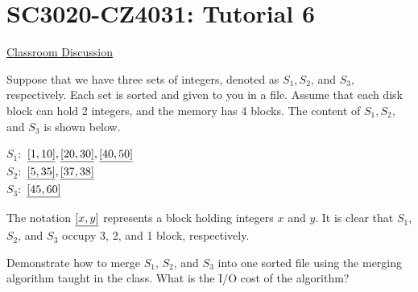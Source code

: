 


\usepackage{amsfonts, amsmath, amssymb, amsthm}
\usepackage{comment}
\usepackage{graphicx}
\usepackage{ifthen}
\usepackage{latexsym}
\usepackage[normalem]{ulem}



\def\dom{\prec}
\def\T{\mathcal{T}}




\section*{SC3020-CZ4031: Tutorial 6}

\begin{center}
    \uline{Classroom Discussion}
\end{center}


 Suppose that we have three sets of integers, denoted as $S_1, S_2$, and $S_3$, respectively. Each set is sorted and given to you in a file. Assume that each disk block can hold 2 integers, and the memory has 4 blocks. The content of $S_1, S_2$, and $S_3$ is shown below.

\vgap

\noindent $S_1:$ $\uline{[1, 10]}, \uline{[20, 30]}, \uline{[40, 50]}$ \\
$S_2:$ $\uline{[5, 35]}, \uline{[37, 38]}$ \\
$S_3:$ $\uline{[45, 60]}$

\vgap

\noindent The notation $\uline{[x, y]}$ represents a block holding integers $x$ and $y$. It is clear that $S_1$, $S_2$, and $S_3$ occupy 3, 2, and 1 block, respectively.

\vgap

Demonstrate how to merge $S_1$, $S_2$, and $S_3$ into one sorted file using the merging algorithm taught in the class. What is the I/O cost of the algorithm?

